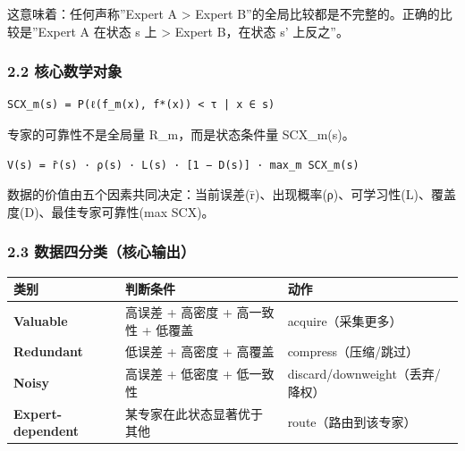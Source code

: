 \documentclass[
  12pt,
]{ctexart}
\begin{document}
这意味着：任何声称''Expert A \textgreater{} Expert
B''的全局比较都是不完整的。正确的比较是''Expert A 在状态 s 上
\textgreater{} Expert B，在状态 s' 上反之''。

\subsubsection{2.2
核心数学对象}\label{ux6838ux5fc3ux6570ux5b66ux5bf9ux8c61}

\begin{verbatim}
SCX_m(s) = P(ℓ(f_m(x), f*(x)) < τ | x ∈ s)
\end{verbatim}

专家的可靠性不是全局量 R\_m，而是状态条件量 SCX\_m(s)。

\begin{verbatim}
V(s) = r̄(s) · ρ(s) · L(s) · [1 − D(s)] · max_m SCX_m(s)
\end{verbatim}

数据的价值由五个因素共同决定：当前误差(r̄)、出现概率(ρ)、可学习性(L)、覆盖度(D)、最佳专家可靠性(max
SCX)。

\subsubsection{2.3
数据四分类（核心输出）}\label{ux6570ux636eux56dbux5206ux7c7bux6838ux5fc3ux8f93ux51fa}

\begin{longtable}[]{@{}
  >{\raggedright\arraybackslash}p{}
  >{\raggedright\arraybackslash}p{}
  >{\raggedright\arraybackslash}p{}@{}}
\toprule\noalign{}
\begin{minipage}[b]{\linewidth}\raggedright
类别
\end{minipage} & \begin{minipage}[b]{\linewidth}\raggedright
判断条件
\end{minipage} & \begin{minipage}[b]{\linewidth}\raggedright
动作
\end{minipage} \\
\midrule\noalign{}
\endhead
\bottomrule\noalign{}
\endlastfoot
\textbf{Valuable} & 高误差 + 高密度 + 高一致性 + 低覆盖 &
acquire（采集更多） \\
\textbf{Redundant} & 低误差 + 高密度 + 高覆盖 & compress（压缩/跳过） \\
\textbf{Noisy} & 高误差 + 低密度 + 低一致性 &
discard/downweight（丢弃/降权） \\
\textbf{Expert-dependent} & 某专家在此状态显著优于其他 &
route（路由到该专家） \\
\end{longtable}
\end{document}
